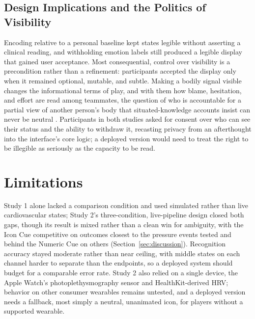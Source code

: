 \documentclass[manuscript,review,anonymous]{acmart}
\begin{document}
\subsection{Design Implications and the Politics of Visibility}
Encoding relative to a personal baseline kept states legible without asserting a clinical reading, and withholding emotion labels still produced a legible display that gained user acceptance. Most consequential, control over visibility is a precondition rather than a refinement: participants accepted the display only when it remained optional, mutable, and subtle. Making a bodily signal visible changes the informational terms of play, and with them how blame, hesitation, and effort are read among teammates, the question of who is accountable for a partial view of another person's body that situated-knowledge accounts insist can never be neutral \cite{haraway_situated_1988}. Participants in both studies asked for consent over who can see their status and the ability to withdraw it, recasting privacy from an afterthought into the interface's core logic; a deployed version would need to treat the right to be illegible as seriously as the capacity to be read.

\section{Limitations}
\label{sec:limitations}

Study 1 alone lacked a comparison condition and used simulated rather than live cardiovascular states; Study 2's three-condition, live-pipeline design closed both gaps, though its result is mixed rather than a clean win for ambiguity, with the Icon Cue competitive on outcomes closest to the pressure events tested and behind the Numeric Cue on others (Section~\ref{sec:discussion}). Recognition accuracy stayed moderate rather than near ceiling, with middle states on each channel harder to separate than the endpoints, so a deployed system should budget for a comparable error rate. Study 2 also relied on a single device, the Apple Watch's photoplethysmography sensor and HealthKit-derived HRV; behavior on other consumer wearables remains untested, and a deployed version needs a fallback, most simply a neutral, unanimated icon, for players without a supported wearable.
\end{document}
